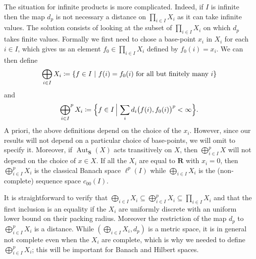 \documentclass[a4paper]{article}
\newcounter{mycomment}
\newcommand{\mycomment}[2][]{\refstepcounter{mycomment}{\todo[color={green!33},size=\small]{\textbf{Commentaire [\uppercase{#1}\themycomment]:}~#2}}}
\newcommand{\GS}[1]{\mycomment[GS]{#1}}
\theoremstyle{definition}
\DeclareMathOperator\Aut{Aut}
\newcommand*{\field}[1]{\mathbf{#1}}
\newcommand*{\category}[1]{\textbf{#1}}
\newcommand*{\CatS}{\category{S}}
\newcommand*{\R}{\field{R}}
\newcommand{\setst}[2]{\{#1\ |\ #2\}}
\begin{document}
The situation for infinite products is more complicated. Indeed, if $I$ is infinite then the map $d_p$ is not necessary a distance on $\prod_{i\in I}X_i$ as it can take infinite values.
The solution consists of looking at the subset of $\prod_{i\in I}X_i$ on which $d_p$ takes finite values.
Formally we first need to chose a base-point $x_i$ in $X_i$ for each $i\in I$, which gives us an element $f_0\in \prod_{i\in I}X_i$ defined by $f_0(i)=x_i$. We can then define
\begin{equation*}
\sideset{}{}\bigoplus_{i \in I}X_i \coloneqq\setst{f\in I}{f(i)=f_0(i)\textnormal{ for all but finitely many }i}
\end{equation*}
and%
\begin{equation*}
\sideset{}{^p}\bigoplus_{i \in I}X_i \coloneqq\Bigl\{f\in I\,\Big|\,\sum_i d_i\bigl(f(i),f_0(i)\bigr)^p<\infty\Bigr\}.
\end{equation*}
A priori, the above definitions depend on the choice of the $x_i$. However, since our results will not depend on a particular choice of base-points, we will omit to specify it.
Moreover, if $\Aut_\CatS(X)$ acts transitively on $X$, then $\bigoplus_{i \in I}^pX$ will not depend on the choice of $x\in X$. If all the $X_i$ are equal to $\R$ with $x_i =0$, then $\bigoplus_{i \in I}^pX_i$ is the classical Banach space $\ell^p(I)$ while $\bigoplus_{i \in I}X_i$ is the (non-complete) sequence space $c_{00}(I)$.

It is straightforward to verify that $\bigoplus_{i\in I} X_i\subseteq\bigoplus_{i\in I}^p X_i\subseteq\prod_{i\in I}X_i$ and that the first inclusion is an equality if the $X_i$ are uniformly discrete with an uniform lower bound on their packing radius.
Moreover the restriction of the map $d_p$ to $\bigoplus_{i\in I}^p X_i$ is a distance.
While $(\bigoplus_{i\in I} X_i, d_p)$ is a metric space, it is in general not complete even when the $X_i$ are complete, which is why we needed to define $\bigoplus_{i\in I}^p X_i$; this will be important for Banach and Hilbert spaces.
\end{document}
